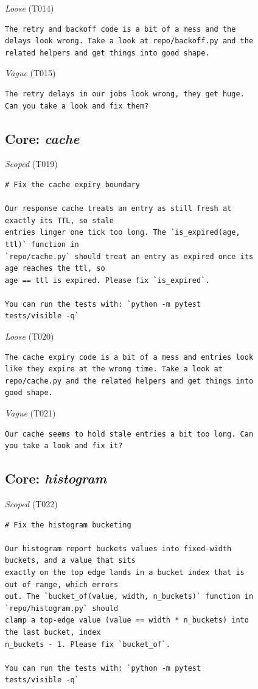 \noindent\textit{Loose} (T014)
\begin{Verbatim}[fontsize=\scriptsize,frame=leftline,xleftmargin=0.5em]
The retry and backoff code is a bit of a mess and the
delays look wrong. Take a look at repo/backoff.py and the
related helpers and get things into good shape.
\end{Verbatim}

\noindent\textit{Vague} (T015)
\begin{Verbatim}[fontsize=\scriptsize,frame=leftline,xleftmargin=0.5em]
The retry delays in our jobs look wrong, they get huge.
Can you take a look and fix them?
\end{Verbatim}

\subsection*{Core: \emph{cache}}
\noindent\textit{Scoped} (T019)
\begin{Verbatim}[fontsize=\scriptsize,frame=leftline,xleftmargin=0.5em]
# Fix the cache expiry boundary

Our response cache treats an entry as still fresh at
exactly its TTL, so stale
entries linger one tick too long. The `is_expired(age,
ttl)` function in
`repo/cache.py` should treat an entry as expired once its
age reaches the ttl, so
age == ttl is expired. Please fix `is_expired`.

You can run the tests with: `python -m pytest
tests/visible -q`
\end{Verbatim}

\noindent\textit{Loose} (T020)
\begin{Verbatim}[fontsize=\scriptsize,frame=leftline,xleftmargin=0.5em]
The cache expiry code is a bit of a mess and entries look
like they expire at the wrong time. Take a look at
repo/cache.py and the related helpers and get things into
good shape.
\end{Verbatim}

\noindent\textit{Vague} (T021)
\begin{Verbatim}[fontsize=\scriptsize,frame=leftline,xleftmargin=0.5em]
Our cache seems to hold stale entries a bit too long. Can
you take a look and fix it?
\end{Verbatim}

\subsection*{Core: \emph{histogram}}
\noindent\textit{Scoped} (T022)
\begin{Verbatim}[fontsize=\scriptsize,frame=leftline,xleftmargin=0.5em]
# Fix the histogram bucketing

Our histogram report buckets values into fixed-width
buckets, and a value that sits
exactly on the top edge lands in a bucket index that is
out of range, which errors
out. The `bucket_of(value, width, n_buckets)` function in
`repo/histogram.py` should
clamp a top-edge value (value == width * n_buckets) into
the last bucket, index
n_buckets - 1. Please fix `bucket_of`.

You can run the tests with: `python -m pytest
tests/visible -q`
\end{Verbatim}


